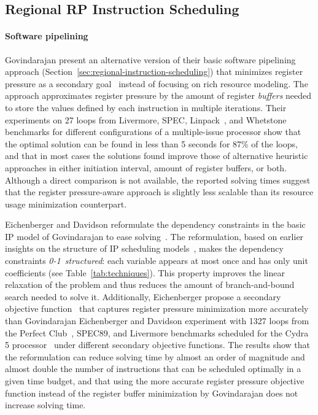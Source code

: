 \documentclass[acmsmall,authorversion,nonacm]{acmart}
\begin{document}
\subsection{Regional RP Instruction Scheduling}
\label{sec:regional-rp-instruction-scheduling}

\paragraph{Software pipelining}

Govindarajan \etal{} present an alternative version of their basic
software pipelining approach
(Section~\ref{sec:regional-instruction-scheduling}) that minimizes
register pressure as a secondary goal~\cite{Govindarajan1994b} instead
of focusing on rich resource modeling.
The approach approximates register pressure by the amount of register
\emph{buffers} needed to store the values defined by each instruction
in multiple iterations.
Their experiments on 27 loops from Livermore, SPEC,
Linpack~\cite{Dongarra2003}, and Whetstone benchmarks for different
configurations of a multiple-issue processor show that the optimal
solution can be found in less than 5 seconds for 87\% of the loops,
and that in most cases the solutions found improve those of
alternative heuristic approaches in either initiation interval, amount
of register buffers, or both.
Although a direct comparison is not available, the reported solving
times suggest that the register pressure-aware approach is slightly
less scalable than its resource usage minimization counterpart.

Eichenberger and Davidson reformulate the dependency constraints in
the basic IP model of Govindarajan \etal{} to ease
solving~\cite{Eichenberger1997}.
The reformulation, based on earlier insights on the structure of IP
scheduling models~\cite{Chaudhuri1994}, makes the dependency
constraints \mbox{\emph{0-1 structured}}: each variable appears at
most once and has only unit coefficients (see
Table~\ref{tab:techniques}).
This property improves the linear relaxation of the problem and thus
reduces the amount of branch-and-bound search needed to solve it.
Additionally, Eichenberger \etal{} propose a secondary objective
function~\cite{Eichenberger1995} that captures register pressure
minimization more accurately than Govindarajan \etal{}
Eichenberger and Davidson experiment with 1327 loops from the Perfect
Club~\cite{Berry1988}, SPEC89, and Livermore benchmarks scheduled for
the Cydra 5 processor~\cite{Beck1993} under different secondary
objective functions.
The results show that the reformulation can reduce solving time by
almost an order of magnitude and almost double the number of
instructions that can be scheduled optimally in a given time budget,
and that using the more accurate register pressure objective function
instead of the register buffer minimization by Govindarajan \etal{}
does not increase solving time.
\end{document}
